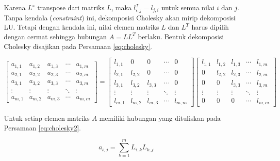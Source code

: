 \documentclass[]{book}
\theoremstyle{definition}
\theoremstyle{definition}
\theoremstyle{definition}
\theoremstyle{remark}
\begin{document}
Karena \(L^∗\) transpose dari matriks \(L\), maka \(l^{T}_{i,j} = l_{j,i}\) untuk semua nilai \(i\) dan \(j\). Tanpa kendala (\emph{constraint}) ini, dekomposisi Cholesky akan mirip dekomposisi LU. Tetapi dengan kendala ini, nilai elemen matriks \(L\) dan \(L^T\) harus dipilih dengan cermat sehingga hubungan \(A = LL^T\) berlaku. Bentuk dekomposisi Cholesky disajikan pada Persamaan \eqref{eq:cholesky}.

\begin{equation}
\begin{bmatrix}
     a_{1,1} & a_{1,2} & a_{1,3} &\cdots& a_{1,m}           \\[0.3em]
     a_{2,1} & a_{2,2} & a_{2,3} &\cdots& a_{2,m}           \\[0.3em]
     a_{3,1} & a_{3,2} & a_{3,3} &\cdots& a_{3,m}           \\[0.3em]
     \vdots  & \vdots  & \vdots  &\ddots& \vdots            \\[0.3em]
     a_{m,1} & a_{m,2} & a_{m,3} &\cdots& a_{m,m}
     \end{bmatrix}
=
\begin{bmatrix}
     l_{1,1} & 0       & 0       &\cdots& 0           \\[0.3em]
     l_{2,1} & l_{2,2} & 0       &\cdots& 0           \\[0.3em]
     l_{3,1} & l_{3,2} & l_{3,3} &\cdots& 0           \\[0.3em]
     \vdots  & \vdots  & \vdots  &\ddots& \vdots            \\[0.3em]
     l_{m,1} & l_{m,2} & l_{m,3} &\cdots& l_{m,m}
     \end{bmatrix}
\begin{bmatrix}
     l_{1,1} & l_{1,2} & l_{1,3} &\cdots& l_{1,m}           \\[0.3em]
     0       & l_{2,2} & l_{2,3} &\cdots& l_{2,m}           \\[0.3em]
     0       & 0       & l_{3,3} &\cdots& l_{3,m}           \\[0.3em]
     \vdots  & \vdots  & \vdots  &\ddots& \vdots            \\[0.3em]
     0       & 0       & 0       &\cdots& l_{m,m}
     \end{bmatrix}
  \label{eq:cholesky}
\end{equation}

Untuk setiap elemen matriks \(A\) memiliki hubungan yang dituliskan pada Persamaan \eqref{eq:cholesky2}.

\begin{equation}
a_{i,j}=\sum_{k=1}^mL_{i,k}L_{k,j}
  \label{eq:cholesky2}
\end{equation}
\end{document}

